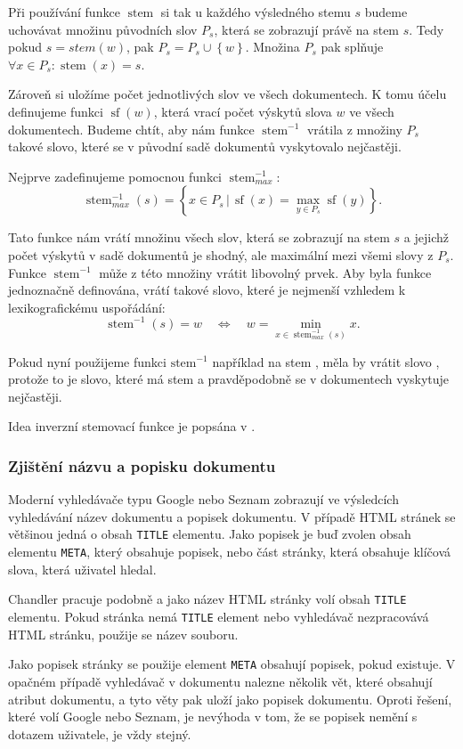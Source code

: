 \documentclass[12pt]{article}
\newcommand{\name}{Chandler}
\newcommand{\code}[1]{\texttt{#1}}
\newcommand{\sep}{\,|\,}
\newcommand{\sssection}[1]{\subsubsection{#1}}
\newcommand{\adds}[1]{\left\{#1\right\}}
\newcommand{\eq}{\Leftrightarrow}
\DeclareMathOperator{\stem}{stem}
\DeclareMathOperator{\wcount}{sf}
\newcommand{\invstem}{\stem^{-1}}
\begin{document}
Při používání funkce $\stem$ si tak u každého výsledného stemu $s$ budeme uchovávat množinu původních slov $P_s$, která se zobrazují právě na stem $s$. Tedy pokud $s=stem(w)$, pak $P_s=P_s\cup\adds{w}$. Množina $P_s$ pak splňuje $\forall x\in P_s: \stem(x)=s$. 

Zároveň si uložíme počet jednotlivých slov ve všech dokumentech. K tomu účelu definujeme funkci $\wcount(w)$, která vrací počet výskytů slova $w$ ve všech dokumentech. Budeme chtít, aby nám funkce $\invstem$ vrátila z množiny $P_s$ takové slovo, které se v původní sadě dokumentů vyskytovalo nejčastěji. 

Nejprve zadefinujeme pomocnou funkci $\invstem_{max}$:
$$\invstem_{max}(s)=\adds{x\in P_s \sep \wcount(x) = \max_{y\in P_s}\wcount(y)}.$$

Tato funkce nám vrátí množinu všech slov, která se zobrazují na stem $s$ a jejichž počet výskytů v sadě dokumentů je shodný, ale maximální mezi všemi slovy z $P_s$. Funkce $\invstem$ může z této množiny vrátit libovolný prvek. Aby byla funkce jednoznačně definována, vrátí takové slovo, které je nejmenší vzhledem k lexikografickému uspořádání:
$$\invstem(s)=w\quad\eq\quad w=\min_{x\in \invstem_{max}(s)}x.$$

Pokud nyní použijeme funkci $\mbox{stem}^{-1}$ například na stem , měla by vrátit slovo , protože to je slovo, které má stem  a pravděpodobně se v dokumentech vyskytuje nejčastěji. 

Idea inverzní stemovací funkce je popsána v \cite{searchsleuth}.

\sssection{Zjištění názvu a popisku dokumentu}
Moderní vyhledávače typu Google nebo Seznam zobrazují ve výsledcích vyhledávání název dokumentu a popisek dokumentu. V případě HTML stránek se většinou jedná o obsah \code{TITLE} elementu. Jako popisek je buď zvolen obsah elementu \code{META}, který obsahuje popisek, nebo část stránky, která obsahuje klíčová slova, která uživatel hledal. 

\name{} pracuje podobně a jako název HTML stránky volí obsah \code{TITLE} elementu. Pokud stránka nemá \code{TITLE} element nebo vyhledávač nezpracovává HTML stránku, použije se název souboru. 

Jako popisek stránky se použije element \code{META} obsahují popisek, pokud existuje. V opačném případě vyhledávač v dokumentu nalezne několik vět, které obsahují atribut dokumentu, a tyto věty pak uloží jako popisek dokumentu. Oproti řešení, které volí Google nebo Seznam, je nevýhoda v tom, že se popisek nemění s dotazem uživatele, je vždy stejný. 
\end{document}
